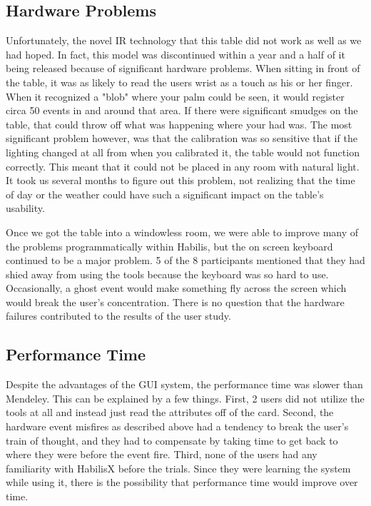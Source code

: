 \documentclass{article}
\begin{document}
\subsection*{Hardware Problems}
Unfortunately, the novel IR technology that this table did not work as well as we had hoped.  In fact, this model was discontinued within a year and a half of it being released because of significant hardware problems.  When sitting in front of the table, it was as likely to read the users wrist as a touch as his or her finger.  When it recognized a "blob" where your palm could be seen, it would register circa 50 events in and around that area.  If there were significant smudges on the table, that could throw off what was happening where your had was.  The most significant problem however, was that the calibration was so sensitive that if the lighting changed at all from when you calibrated it, the table would not function correctly.  This meant that it could not be placed in any room with natural light.  It took us several months to figure out this problem, not realizing that the time of day or the weather could have such a significant impact on the table's usability.  

Once we got the table into a windowless room, we were able to improve many of the problems programmatically within Habilis, but the on screen keyboard continued to be a major problem.  5 of the 8 participants mentioned that they had shied away from using the tools because the keyboard was so hard to use.  Occasionally, a ghost event would make something fly across the screen which would break the user's concentration.  There is no question that the hardware failures contributed to the results of the user study.      
\subsection*{Performance Time}

Despite the advantages of the GUI system, the performance time was slower than Mendeley.  This can be explained by a few things.  First, 2 users did not utilize the tools at all and instead just read the attributes off of the card.  Second, the hardware event misfires as described above had a tendency to break the user's train of thought, and they had to compensate by taking time to get back to where they were before the event fire.  Third, none of the users had any familiarity with HabilisX before the trials.  Since they were learning the system while using it, there is the possibility that performance time would improve over time. 
\end{document}
